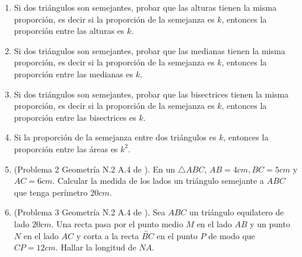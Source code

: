 	\begin{enumerate}
		\item Si dos triángulos son semejantes, probar que las alturas tienen la misma proporción, es decir si la proporción de la semejanza es $k$, entonces la proporción entre las alturas es $k$.
		
		\item Si dos triángulos son semejantes, probar que las medianas tienen la misma proporción, es decir si la proporción de la semejanza es $k$, entonces la proporción entre las medianas es $k$.
		
		\item Si dos triángulos son semejantes, probar que las bisectrices tienen la misma proporción, es decir si la proporción de la semejanza es $k$, entonces la proporción entre las bisectrices es $k$.
		
		\item Si la proporción de la semejanza entre dos triángulos es $k$, entonces la proporción entre las áreas es $k^2$.
		
		\item (Problema 2 Geometría N.2 A.4 de \cite{POTI}). En un $\triangle ABC$, $AB=4cm,BC=5cm$ y $AC=6cm$. Calcular la medida de los lados un triángulo semejante a $ABC$ que tenga perímetro $20cm$.
		
		\item (Problema 3  Geometría N.2 A.4 de \cite{POTI}). Sea $ABC$ un triángulo equilatero de lado $20cm$. Una recta pasa por el punto medio $M$ en el lado $AB$ y un punto $N$ en el lado $AC$ y corta a la recta $\overleftrightarrow{BC}$ en el punto $P$ de modo que $CP=12cm$. Hallar la longitud de $NA$.
		
		

\end{enumerate}

